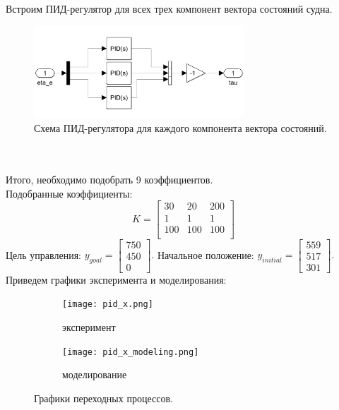 \documentclass[12pt]{article}
\begin{document}
Встроим ПИД-регулятор для всех трех компонент вектора состояний судна.
\begin{figure}[H]
    \centering
    \includegraphics[width=0.7\textwidth]{pid_simulink_scheme.png}
    \caption{Схема ПИД-регулятора для каждого компонента вектора состояний.}
    \label{fig:pid_simulink_scheme.png}
\end{figure}\\
\ \\
Итого, необходимо подобрать 9 коэффициентов. \\
Подобранные коэффициенты:
\[ K = 
\begin{bmatrix}
    30 & 20 & 200 \\
    1 & 1 & 1 \\
    100 & 100 & 100 \\
\end{bmatrix}
\]
Цель управления: $y_{goal} = \begin{bmatrix}
    750 \\ 450 \\ 0
\end{bmatrix}.$
Начальное положение: $y_{initial} = \begin{bmatrix}
    559 \\ 517 \\ 301
\end{bmatrix}.$
\ \\
Приведем графики эксперимента и моделирования:
\begin{figure}[H]
    \centering
    \begin{subfigure}{0.49\textwidth}
        \centering
        \texttt{[image: pid\_x.png]}
        \caption{эксперимент}
         \label{fig:pid_x.png}
     \end{subfigure}
     \hfill
     \begin{subfigure}{0.49\textwidth}
         \centering
         \texttt{[image: pid\_x\_modeling.png]}
         \caption{моделирование}
         \label{fig:pid_x_modeling.png}
     \end{subfigure}
    \caption{Графики переходных процессов.}
    \label{fig:two graphs}
\end{figure}
\end{document}
